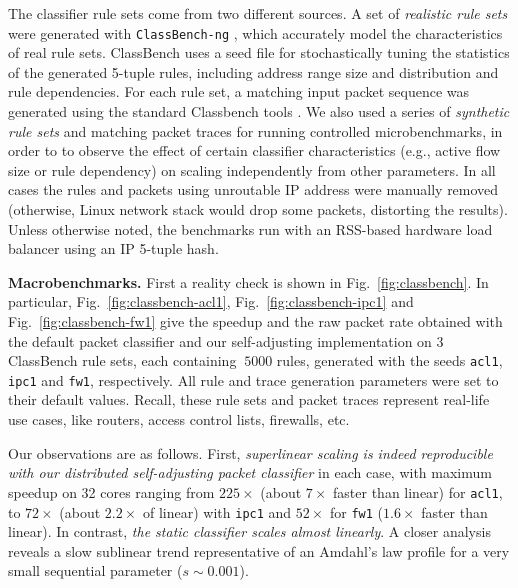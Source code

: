 The classifier rule sets come from two different sources. A set of \emph{realistic rule sets} were generated with \texttt{ClassBench-ng} \cite{10.1109/ANCS.2017.33, 4237157}, which accurately model the characteristics of real rule sets. ClassBench uses a seed file for stochastically tuning the statistics of the generated 5-tuple rules, including address range size and distribution and rule dependencies. %
For each rule set, a matching input packet sequence was generated using the standard Classbench tools \cite{10.1109/ANCS.2017.33,classbench-pcap}. We also used a series of \emph{synthetic rule sets} and matching packet traces for running controlled microbenchmarks, in order to to observe the effect of certain classifier characteristics (e.g., active flow size or rule dependency) on scaling independently from other parameters. In all cases the rules and packets using unroutable IP address were manually removed (otherwise, Linux network stack would drop some packets, distorting the results). Unless otherwise noted, the benchmarks run with an RSS-based hardware load balancer using an IP 5-tuple hash.

\noindent
\textbf{Macrobenchmarks.} %
First a reality check is shown in Fig.~\ref{fig:classbench}. In particular, Fig.~\ref{fig:classbench-acl1}, Fig.~\ref{fig:classbench-ipc1} and Fig.~\ref{fig:classbench-fw1} give the speedup and the raw packet rate obtained with the default \nftables packet classifier and our self-adjusting implementation on 3 ClassBench rule sets, each containing $~5000$ rules, generated with the seeds \texttt{acl1}, \texttt{ipc1} and \texttt{fw1}, respectively. All rule and trace generation parameters were set to their default values. Recall, these rule sets and packet traces represent real-life use cases, like routers, access control lists, firewalls, etc.

Our observations are as follows. First, \emph{superlinear scaling is indeed reproducible with our distributed self-adjusting packet classifier} in each case, with maximum speedup on 32 cores ranging from $225\times$ (about $7\times$ faster than linear) for \texttt{acl1}, to $72\times$ (about $2.2\times$ of linear) with \texttt{ipc1} and $52\times$ for \texttt{fw1} ($1.6\times$ faster than linear). In contrast, \emph{the static \nftables classifier scales almost linearly}. A closer analysis reveals a slow sublinear trend representative of an Amdahl's law profile for a very small sequential parameter ($s\sim 0.001$).

